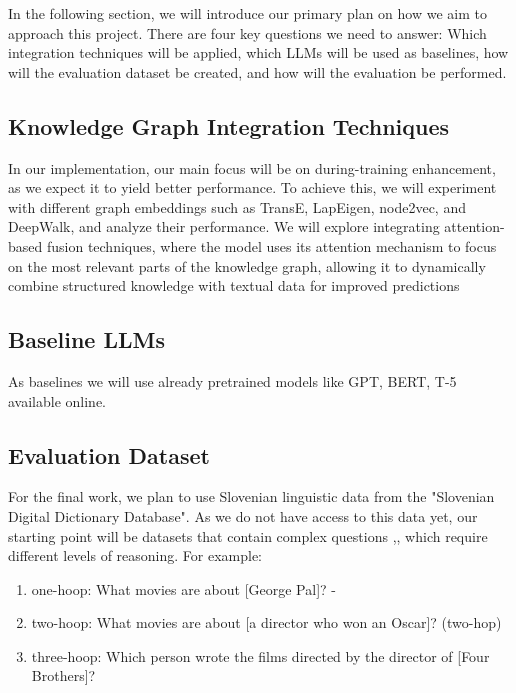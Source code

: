 \documentclass[fleqn,moreauthors,10pt]{ds_report}
\begin{document}
In the following section, we will introduce our primary plan on how we aim to approach this project.
There are four key questions we need to answer: Which integration techniques will be applied, which LLMs will be used as baselines, how will the evaluation dataset be created, and how will the evaluation be performed.

\subsection*{Knowledge Graph Integration Techniques}


In our implementation, our main focus will be on during-training enhancement, as we expect it to yield better performance. To achieve this, we will experiment with different graph embeddings such as TransE, LapEigen, node2vec, and DeepWalk, and analyze their performance.
We will explore integrating attention-based fusion techniques, where the model uses its attention mechanism to focus on the most relevant parts of the knowledge graph, allowing it to dynamically combine structured knowledge with textual data for improved predictions

\subsection*{Baseline LLMs}


As baselines we will use already pretrained models like GPT, BERT, T-5 available online. 

\subsection*{Evaluation Dataset}

For the final work, we plan to use Slovenian linguistic data from the "Slovenian Digital Dictionary Database". As we do not have access to this data yet, our starting point will be datasets that contain complex questions \cite{talmor2018web},\cite{zhang2017variational}, which require different levels of reasoning. For example: 
\begin{enumerate}
    \item one-hoop: What movies are about [George Pal]? - 
    \item two-hoop: What movies are about [a director who won an Oscar]? (two-hop)
    \item three-hoop: Which person wrote the films directed by the director of [Four Brothers]? 
\end{enumerate}
\end{document}
